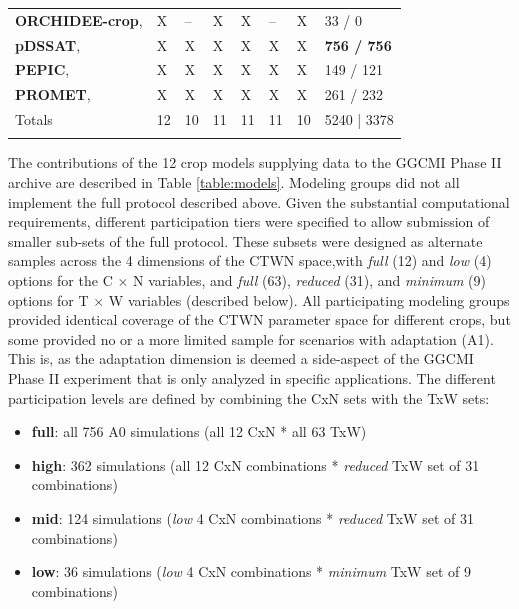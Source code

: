 \documentclass[gmd, manuscript]{copernicus} %
\begin{document}
\begin{table}[t]
\begin{tabular}{p{6cm} p{1cm} p{1cm} p{1cm} p{1cm} p{1cm} p{1cm} p{1.9cm}}
        {\textbf{ORCHIDEE-crop},\citet{Wu2016}} & {X} & {--} & {X} & {X} & {--} & {X} & {33 / 0}\\ \middlehline
        {\textbf{pDSSAT},       \citet{Elliott2014b, JONES2003235}} & {X} & {X} & {X} & {X} & {X} & {X} & {\textbf{756 / 756}}\\ \middlehline
        {\textbf{PEPIC},        \citet{LIU2016164, LIU2016}} & {X} & {X} & {X} & {X} & {X} & {X} & {149 / 121}\\ \middlehline
        {\textbf{PROMET},       \citet{Hank2015, MAUSER2015}} & {X} & {X} & {X} & {X} & {X} & {X} & {261 / 232}\\ \middlehline
        {Totals} & {12} & {10} & {11} & {11} & {11} & {10} & {5240 | 3378}\\
        \bottomhline
    \end{tabular}
\end{table}

The contributions of the 12 crop models supplying data to the GGCMI Phase II archive are described in Table \ref{table:models}.
Modeling groups did not all implement the full protocol described above. Given the substantial computational requirements, different participation tiers were specified to allow submission of smaller sub-sets of the full protocol. 
These subsets were designed as alternate samples across the 4 dimensions of the CTWN space,with \textit{full} (12) and \textit{low} (4) options for the C $\times$ N variables, and \textit{full} (63), \textit{reduced} (31), and \textit{minimum} (9) options for T $\times$ W variables (described below). All participating modeling groups provided identical coverage of the CTWN parameter space for different crops, but some provided no or a more limited sample for scenarios with adaptation (A1).
This is, as the adaptation dimension is deemed a side-aspect of the GGCMI Phase II experiment that is only analyzed in specific applications.
The different participation levels are defined by combining the CxN sets with the TxW sets:
\begin{itemize}
\item{\textbf{full}: all 756 A0 simulations (all 12 CxN * all 63 TxW)}
\item{\textbf{high}: 362 simulations (all 12 CxN combinations * \textit{reduced} TxW set of 31 combinations)}
\item{\textbf{mid}: 124 simulations (\textit{low} 4 CxN combinations * \textit{reduced} TxW set of 31 combinations)}
\item{\textbf{low}: 36 simulations (\textit{low} 4 CxN combinations * \textit{minimum} TxW set of 9 combinations)}
\end{itemize}
\end{document}
